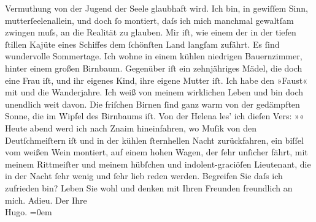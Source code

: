 \begin{ledgroupsized}[t]{13cm}
               Vermuthung von der Jugend der Seele glaubhaft wird. Ich bin, in gewiſſem Sinn,
               mutterſeelenallein, und {\pb}doch ſo
               montiert, daſs ich mich manchmal gewaltſam zwingen muſs, an die Realität zu glauben.
               Mir iſt, wie einem der in der tiefen ſtillen Kajüte eines Schiffes dem ſchönſten Land
               langſam zufährt.\pend
           \pstart
           Es ſind wundervolle Sommertage. Ich wohne in einem kühlen niedrigen Bauernzimmer,
               hinter einem großen Birnbaum. Gegenüber iſt ein zehnjähriges Mädel, die doch eine
               Frau iſt, und ihr eigenes Kind, ihre eigene Mutter iſt. Ich habe den »Faust« mit und die Wanderjahre. Ich weiß von meinem {\pb}wirklichen Leben und bin doch
               unendlich weit davon.\pend
           \pstart
           Die friſchen Birnen ſind ganz warm von der gedämpften Sonne, die im Wipfel des
               Birnbaums iſt. Von der Helena les’ ich dieſen
               Vers: »\label{K_L00476-2v}\label{K_L00476-2h}« Heute abend werd ich nach Znaim hineinfahren, wo Muſik von den Deutſchmeiſtern iſt und in der kühlen ſternhellen Nacht zurückfahren, ein
               biſſel vom weißen Wein montiert, auf einem hohen Wagen, der ſehr {\pb}unſicher fährt, mit meinem
               Rittmeiſter und meinem hübſchen und indolent-graciöſen Lieutenant, die in der Nacht
               ſehr wenig und ſehr lieb reden werden. Begreifen Sie daſs ich zufrieden bin?\pend
           \pstart
           Leben Sie wohl und denken mit Ihren Freunden freundlich an mich. Adieu.\pend
           \pstart
           Der Ihre{\\[\baselineskip]}\spacefill\mbox{Hugo.}\pend
           \leftskip=0em{}
         
         \endnumbering{}\end{ledgroupsized}  \newcommand{\dateiname}{L00476}\newcommand{\titel}{Hugo von Hofmannsthal an Arthur Schnitzler, 21. [8. 1895]}\newcommand{\editorInnen}{Martin Anton Müller und Gerd-Hermann Susen}
      